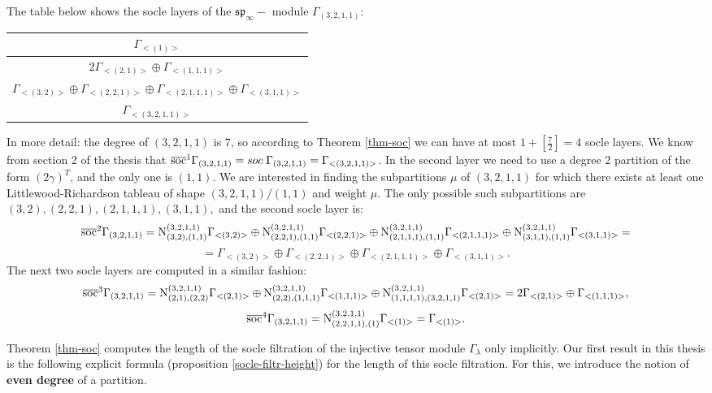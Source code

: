 \documentclass[main.tex]{subfiles}
\begin{document}
\begin{ex}
    \label{ex-socle-filtration}
    The table below shows the socle layers of the $\mathfrak{sp}_\infty-$ module $\Gamma_{(3,2,1,1)}$: \\
    
    \begin{table}[H]
    \centering
    \begin{tabular}{|c|}
        \hline
        $\Gamma_{<(1)>}$ \\
        \hline $2\Gamma_{<(2,1)>} \oplus \Gamma_{<(1,1,1)>}$ \\
       \hline $\Gamma_{<(3,2)>} \oplus \Gamma_{<(2,2,1)>} \oplus \Gamma_{<(2,1,1,1)>} \oplus \Gamma_{<(3,1,1)>}$ \\
        \hline $\Gamma_{<(3,2,1,1)>}$ \\
        \hline
    \end{tabular}
\end{table}
In more detail: the degree of $(3,2,1,1)$ is $7$, so according to Theorem \ref{thm-soc} we can have at most $1+\left[\frac{7}{2}\right]=4$ socle layers. We know from section 2 of the thesis that $\overline{\text{soc}}^{1}\Gamma_{(3,2,1,1)} = soc\;\Gamma_{(3,2,1,1)} = \Gamma_{<(3,2,1,1)>}$. In the second layer we need to use a  degree 2 partition of the form $(2\gamma)^T$, and the only one is $(1,1).$ We are interested in finding the subpartitions $\mu$ of $(3,2,1,1)$ for which there exists at least one Littlewood-Richardson tableau of shape $(3,2,1,1)/(1,1)$ and weight $\mu$. The only possible such subpartitions are $(3,2), (2,2,1), (2,1,1,1), (3,1,1),$ and the second socle layer is: 
$$
    \overline{\text{soc}}^{2}\Gamma_{(3,2,1,1)} =  \text{N}^{(3,2,1,1)}_{(3,2), (1,1)} \Gamma_{<(3,2)>}\oplus \text{N}^{(3,2,1,1)}_{(2,2,1), (1,1)} \Gamma_{<(2,2,1)>} \oplus
    \text{N}^{(3,2,1,1)}_{(2,1,1,1), (1,1)} \Gamma_{<(2,1,1,1)>}\oplus
    \text{N}^{(3,2,1,1)}_{(3,1,1), (1,1)} \Gamma_{<(3,1,1)>}=
$$
$$
    = \Gamma_{<(3,2)>}\oplus \Gamma_{<(2,2,1)>} \oplus \Gamma_{<(2,1,1,1)>}\oplus \Gamma_{<(3,1,1)>}.
$$
The next two socle layers are computed in a similar fashion:
$$
    \overline{\text{soc}}^{3}\Gamma_{(3,2,1,1)} =  \text{N}^{(3,2,1,1)}_{(2,1), (2,2)} \Gamma_{<(2,1)>}\oplus \text{N}^{(3,2,1,1)}_{(2,2), (1,1,1)} \Gamma_{<(1,1,1)>} \oplus
    \text{N}^{(3,2,1,1)}_{(1,1,1,1), (3,2,1,1)} \Gamma_{<(2,1)>}= 2\Gamma_{<(2,1)>}\oplus\Gamma_{<(1,1,1)>},
$$
$$
    \overline{\text{soc}}^{4}\Gamma_{(3,2,1,1)} =  \text{N}^{(3,2,1,1)}_{(2,2,1,1), (1)} \Gamma_{<(1)>} = \Gamma_{<(1)>}.
$$
\end{ex}
\bigskip

Theorem \ref{thm-soc} computes the length of the socle filtration of the injective tensor module $\Gamma_\lambda$ only implicitly. Our first result in this thesis is the following explicit formula (proposition \ref{socle-filtr-height}) for the length of this socle filtration.  For this, we introduce the notion of \textbf{even degree} of a partition. 
\bigskip
\end{document}
